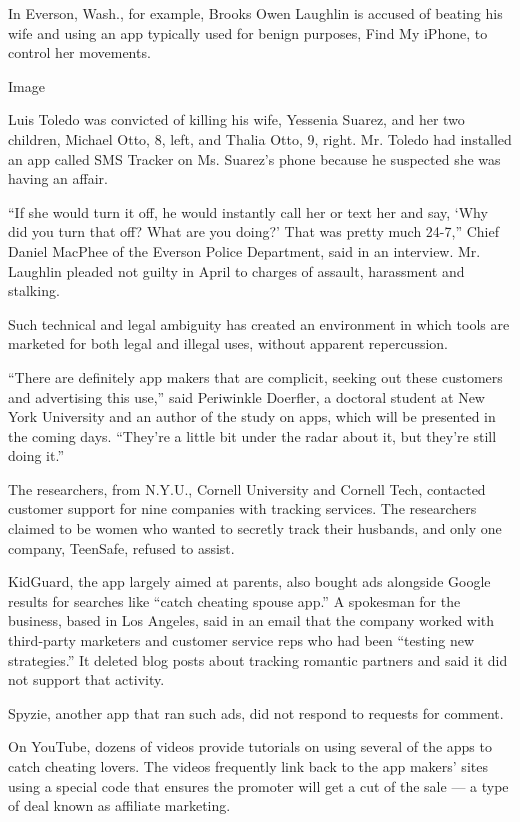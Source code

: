 In Everson, Wash., for example, Brooks Owen Laughlin is accused of
beating his wife and using an app typically used for benign purposes,
Find My iPhone, to control her movements.

Image

Luis Toledo was convicted of killing his wife, Yessenia Suarez, and her
two children, Michael Otto, 8, left, and Thalia Otto, 9, right. Mr.
Toledo had installed an app called SMS Tracker on Ms. Suarez's phone
because he suspected she was having an affair.

``If she would turn it off, he would instantly call her or text her and
say, `Why did you turn that off? What are you doing?' That was pretty
much 24-7,'' Chief Daniel MacPhee of the Everson Police Department, said
in an interview. Mr. Laughlin pleaded not guilty in April to charges of
assault, harassment and stalking.

Such technical and legal ambiguity has created an environment in which
tools are marketed for both legal and illegal uses, without apparent
repercussion.

``There are definitely app makers that are complicit, seeking out these
customers and advertising this use,'' said Periwinkle Doerfler, a
doctoral student at New York University and an author of the study on
apps, which will be presented in the coming days. ``They're a little bit
under the radar about it, but they're still doing it.''

The researchers, from N.Y.U., Cornell University and Cornell Tech,
contacted customer support for nine companies with tracking services.
The researchers claimed to be women who wanted to secretly track their
husbands, and only one company, TeenSafe, refused to assist.

KidGuard, the app largely aimed at parents, also bought ads alongside
Google results for searches like ``catch cheating spouse app.'' A
spokesman for the business, based in Los Angeles, said in an email that
the company worked with third-party marketers and customer service reps
who had been ``testing new strategies.'' It deleted blog posts about
tracking romantic partners and said it did not support that activity.

Spyzie, another app that ran such ads, did not respond to requests for
comment.

On YouTube, dozens of videos provide tutorials on using several of the
apps to catch cheating lovers. The videos frequently link back to the
app makers' sites using a special code that ensures the promoter will
get a cut of the sale --- a type of deal known as affiliate marketing.

